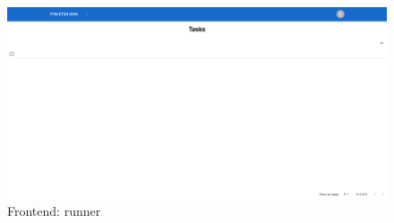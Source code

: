 \begin{figure}[H]
    \centering
    \includegraphics[height=0.2\textheight]{./part/Ejecucion/Seguimiento/PuestaAPunto/img/runner}
    \caption{Frontend: runner}\label{fig:runner}
\end{figure}